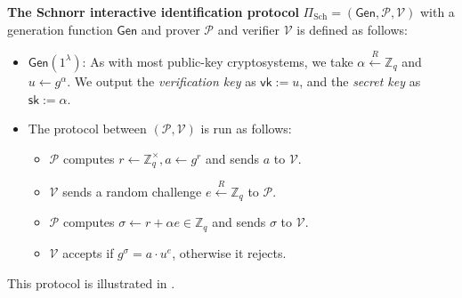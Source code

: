 \documentclass[../lecture-notes-148x210.tex]{subfiles}
\begin{document}
\begin{definition}
    \textbf{The Schnorr interactive identification protocol} $\Pi_{\text{Sch}} = (\mathsf{Gen}, \mathcal{P}, \mathcal{V})$ with a generation function $\mathsf{Gen}$ and prover $\mathcal{P}$ and verifier $\mathcal{V}$ is defined as follows:
    \begin{itemize}
        \item $\mathsf{Gen}(1^{\lambda})$: As with most public-key cryptosystems, we take $\alpha \xleftarrow{R} \mathbb{Z}_q$ and $u \gets g^{\alpha}$. We output the \textit{verification key} as $\mathsf{vk} := u$, and the \textit{secret key} as $\mathsf{sk} := \alpha$.
        \item The protocol between $(\mathcal{P},\mathcal{V})$ is run as follows:
        \begin{itemize}
            \item $\mathcal{P}$ computes $r \gets \mathbb{Z}_q^{\times}, a \gets g^{r}$ and sends $a$ to $\mathcal{V}$.
            \item $\mathcal{V}$ sends a random challenge $e \xleftarrow{R} \mathbb{Z}_q$ to $\mathcal{P}$.
            \item $\mathcal{P}$ computes $\sigma \gets r + \alpha e \in \mathbb{Z}_q$ and sends $\sigma$ to $\mathcal{V}$.
            \item $\mathcal{V}$ accepts if $g^{\sigma} = a \cdot u^e$, otherwise it rejects.
        \end{itemize}
    \end{itemize}

    This protocol is illustrated in . 
\end{definition}
\end{document}
